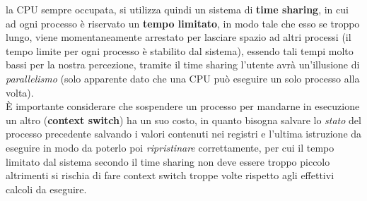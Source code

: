 \documentclass[12pt, letterpaper]{article}
\begin{document}
la CPU sempre occupata, si utilizza quindi un sistema di \textbf{time sharing}, in cui ad ogni processo 
è riservato un \textbf{tempo limitato}, in modo tale che esso se troppo lungo, viene momentaneamente arrestato per 
lasciare spazio ad altri processi (il tempo limite per ogni processo è stabilito dal sistema), essendo tali tempi 
molto bassi per la nostra percezione, tramite il time sharing l'utente avrà un'illusione di \textit{parallelismo} 
(solo apparente dato che una CPU può eseguire un solo processo alla volta).\\
È importante considerare che sospendere un processo per mandarne in esecuzione un altro 
(\textbf{context switch}) ha un suo costo, in quanto bisogna salvare lo \textit{stato} del processo precedente
salvando i valori contenuti nei registri e l'ultima istruzione da eseguire in modo da poterlo poi 
\textit{ripristinare} correttamente, per cui il tempo limitato dal sistema secondo il time sharing non deve 
essere troppo piccolo altrimenti si rischia di fare context switch troppe volte rispetto agli effettivi 
calcoli da eseguire.
\end{document}
